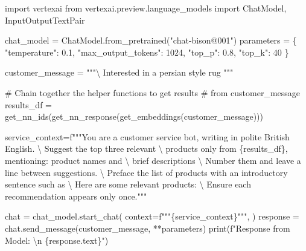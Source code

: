 \documentclass[
  letterpaper,
  DIV=11,
  numbers=noendperiod]{scrreprt}
\newenvironment{Shaded}{\begin{snugshade}}{\end{snugshade}}
\newcommand{\BuiltInTok}[1]{\textcolor[rgb]{0.00,0.23,0.31}{#1}}
\newcommand{\CharTok}[1]{\textcolor[rgb]{0.13,0.47,0.30}{#1}}
\newcommand{\CommentTok}[1]{\textcolor[rgb]{0.37,0.37,0.37}{#1}}
\newcommand{\DecValTok}[1]{\textcolor[rgb]{0.68,0.00,0.00}{#1}}
\newcommand{\FloatTok}[1]{\textcolor[rgb]{0.68,0.00,0.00}{#1}}
\newcommand{\ImportTok}[1]{\textcolor[rgb]{0.00,0.46,0.62}{#1}}
\newcommand{\NormalTok}[1]{\textcolor[rgb]{0.00,0.23,0.31}{#1}}
\newcommand{\OperatorTok}[1]{\textcolor[rgb]{0.37,0.37,0.37}{#1}}
\newcommand{\SpecialCharTok}[1]{\textcolor[rgb]{0.37,0.37,0.37}{#1}}
\newcommand{\SpecialStringTok}[1]{\textcolor[rgb]{0.13,0.47,0.30}{#1}}
\newcommand{\StringTok}[1]{\textcolor[rgb]{0.13,0.47,0.30}{#1}}
\begin{document}
\begin{Shaded}
\begin{Highlighting}[]
\ImportTok{import}\NormalTok{ vertexai}
\ImportTok{from}\NormalTok{ vertexai.preview.language\_models }\ImportTok{import}\NormalTok{ ChatModel, InputOutputTextPair}

\NormalTok{chat\_model }\OperatorTok{=}\NormalTok{ ChatModel.from\_pretrained(}\StringTok{"chat{-}bison@001"}\NormalTok{)}
\NormalTok{parameters }\OperatorTok{=}\NormalTok{ \{}
    \StringTok{"temperature"}\NormalTok{: }\FloatTok{0.1}\NormalTok{,}
    \StringTok{"max\_output\_tokens"}\NormalTok{: }\DecValTok{1024}\NormalTok{,}
    \StringTok{"top\_p"}\NormalTok{: }\FloatTok{0.8}\NormalTok{,}
    \StringTok{"top\_k"}\NormalTok{: }\DecValTok{40}
\NormalTok{\}}

\NormalTok{customer\_message }\OperatorTok{=} \StringTok{"""}\CharTok{\textbackslash{}}
\StringTok{Interested in a persian style rug}
\StringTok{"""}

\CommentTok{\# Chain together the helper functions to get results}
\CommentTok{\# from customer\_message}
\NormalTok{results\_df }\OperatorTok{=}\NormalTok{ get\_nn\_ids(get\_nn\_response(get\_embeddings(customer\_message)))}

\NormalTok{service\_context}\OperatorTok{=}\SpecialStringTok{f"""You are a customer service bot, writing in polite British English. }\CharTok{\textbackslash{}}
\SpecialStringTok{    Suggest the top three relevant }\CharTok{\textbackslash{}}
\SpecialStringTok{    products only from }\SpecialCharTok{\{}\NormalTok{results\_df}\SpecialCharTok{\}}\SpecialStringTok{, mentioning:}
\SpecialStringTok{     product names and }\CharTok{\textbackslash{}}
\SpecialStringTok{     brief descriptions }\CharTok{\textbackslash{}}
\SpecialStringTok{    Number them and leave a line between suggestions. }\CharTok{\textbackslash{}}
\SpecialStringTok{    Preface the list of products with an introductory sentence such as }\CharTok{\textbackslash{}}
\SpecialStringTok{    \textquotesingle{}Here are some relevant products: \textquotesingle{} }\CharTok{\textbackslash{}}
\SpecialStringTok{    Ensure each recommendation appears only once."""}


\NormalTok{chat }\OperatorTok{=}\NormalTok{ chat\_model.start\_chat(}
\NormalTok{    context}\OperatorTok{=}\SpecialStringTok{f"""}\SpecialCharTok{\{}\NormalTok{service\_context}\SpecialCharTok{\}}\SpecialStringTok{"""}\NormalTok{,}
\NormalTok{)}
\NormalTok{response }\OperatorTok{=}\NormalTok{ chat.send\_message(customer\_message, }\OperatorTok{**}\NormalTok{parameters)}
\BuiltInTok{print}\NormalTok{(}\SpecialStringTok{f"Response from Model: }\CharTok{\textbackslash{}n}\SpecialStringTok{ }\SpecialCharTok{\{}\NormalTok{response}\SpecialCharTok{.}\NormalTok{text}\SpecialCharTok{\}}\SpecialStringTok{"}\NormalTok{)}
\end{Highlighting}
\end{Shaded}
\end{document}
